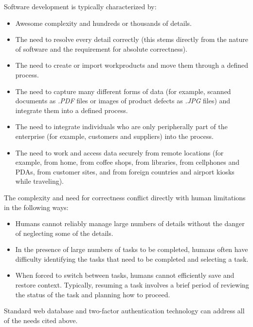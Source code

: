 Software development is typically characterized by:

\begin{itemize}
\item Awesome complexity and hundreds or thousands of details.
\item The need to resolve every detail correctly (this stems
      directly from the nature of software and the requirement
      for absolute correctness).
\item The need to create or import workproducts and move them through
      a defined process.
\item The need to capture many different forms of data (for example,
      scanned documents as 
      \emph{.PDF} files or 
      images of product defects as 
      \emph{.JPG} files) and integrate
      them into a defined process.
\item The need to integrate individuals who are only peripherally part
      of the enterprise (for example, customers and suppliers) into the
      process.
\item The need to work and access data securely from remote locations (for example,
      from home, from coffee shops, from libraries, from cellphones and PDAs,
      from customer sites, and from foreign countries and airport kiosks
      while traveling).             
\end{itemize}

The complexity and need for correctness conflict directly
with human limitations in the following ways:

\begin{itemize}
\item Humans cannot reliably manage large numbers of details without
      the danger of neglecting some of the details.
\item In the presence of large numbers of tasks to be
      completed, humans often have difficulty identifying
      the tasks that need to be completed and selecting
      a task.
\item When forced to switch between tasks, humans cannot 
      efficiently save and restore context.  
      Typically, resuming a task
      involves a brief period of reviewing the status of
      the task and planning how to proceed.      
\end{itemize}

Standard web database and 
two-factor authentication
technology can address all of the needs cited above.



